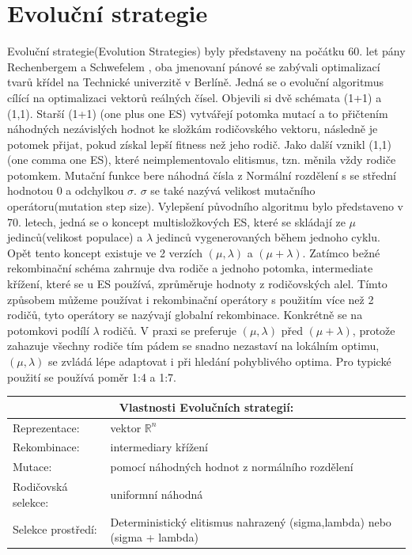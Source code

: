 \section{Evoluční strategie}
Evoluční strategie(Evolution Strategies) byly představeny na počátku 60. let pány Rechenbergem a Schwefelem \citep{Beyer2002}, oba jmenovaní pánové se zabývali optimalizací tvarů křídel na Technické univerzitě v Berlíně. Jedná se o evoluční algoritmus cílící na optimalizaci vektorů reálných čísel. Objevili si dvě schémata (1+1) a (1,1). Starší (1+1) (one plus one ES) vytvářejí potomka mutací a to přičtením náhodných nezávislých hodnot ke složkám rodičovského vektoru, následně je potomek přijat, pokud získal lepší fitness než jeho rodič. Jako další vznikl (1,1) (one comma one ES), které neimplementovalo elitismus, tzn. měnila vždy rodiče potomkem. Mutační funkce bere náhodná čísla z Normální rozdělení s se střední hodnotou 0 a odchylkou $\sigma$. $\sigma$ se také nazývá velikost mutačního operátoru(mutation step size). Vylepšení původního algoritmu bylo představeno v 70. letech, jedná se o koncept multisložkových ES, které se skládají ze $\mu$ jedinců(velikost populace) a $\lambda$ jedinců vygenerovaných během jednoho cyklu. Opět tento koncept existuje ve 2 verzích $(\mu,\lambda)$ a $(\mu + \lambda)$. Zatímco bežné rekombinační schéma zahrnuje dva rodiče a jednoho potomka, intermediate křížení, které se u ES používá, zprůměruje hodnoty z rodičovských alel. Tímto způsobem můžeme používat i rekombinační operátory s použitím více než 2 rodičů, tyto operátory se nazývají globalní rekombinace. Konkrétně se na potomkovi podílí $\lambda$ rodičů. V praxi se preferuje $(\mu,\lambda)$ před $(\mu + \lambda)$, protože zahazuje všechny rodiče tím pádem se snadno nezastaví na lokálním optimu, $(\mu,\lambda)$ se zvládá lépe adaptovat i při hledání pohyblivého optima. Pro typické použití se používá poměr 1:4 a 1:7. 
\begin{center}
  \begin{tabular}{ l l }
      \multicolumn{2}{c}{Vlastnosti Evolučních strategií:} \\
      \hline \hline
      Reprezentace: & vektor $\mathbb{R}^n$ \\
      \hline  
      Rekombinace: & intermediary křížení \\
      \hline  
      Mutace: &  pomocí náhodných hodnot z normálního rozdělení \\
      \hline   
      Rodičovská selekce: & uniformní náhodná \\
      \hline   
      Selekce prostředí: & Deterministický elitismus nahrazený (sigma,lambda) nebo (sigma + lambda) \\
    \end{tabular}
  \end{center} \par
